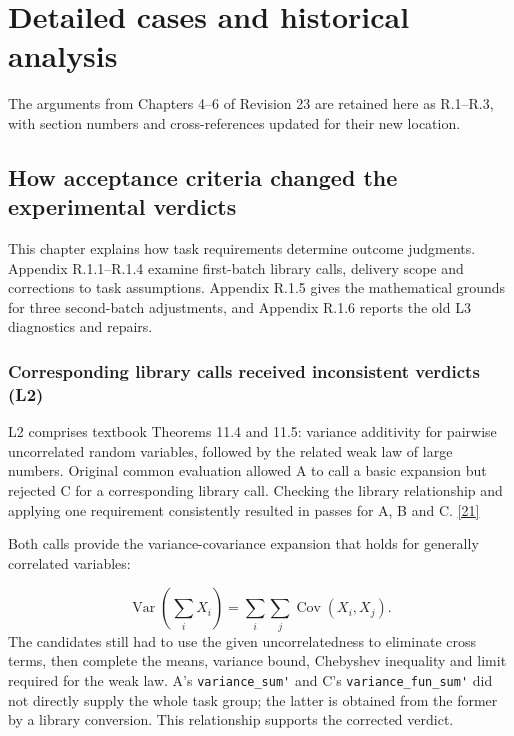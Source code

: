 \section[Detailed cases and historical analysis]{\texorpdfstring{\protect\hypertarget{appendix-r}{}Detailed cases and historical analysis}{Detailed cases and historical analysis}}
The arguments from Chapters 4–6 of Revision 23 are retained here as R.1–R.3, with section numbers and cross-references updated for their new location.

\subsection[How acceptance criteria changed the experimental verdicts]{\texorpdfstring{\protect\hypertarget{r1}{}How acceptance criteria changed the experimental verdicts}{How acceptance criteria changed the experimental verdicts}}
This chapter explains how task requirements determine outcome judgments. Appendix R.1.1–R.1.4 examine first-batch library calls, delivery scope and corrections to task assumptions. Appendix R.1.5 gives the mathematical grounds for three second-batch adjustments, and Appendix R.1.6 reports the old L3 diagnostics and repairs.

\subsubsection[Corresponding library calls received inconsistent verdicts (L2)]{\texorpdfstring{\protect\hypertarget{r1-1}{}Corresponding library calls received inconsistent verdicts (L2)}{Corresponding library calls received inconsistent verdicts (L2)}}
L2 comprises textbook Theorems 11.4 and 11.5: variance additivity for pairwise uncorrelated random variables, followed by the related weak law of large numbers. Original common evaluation allowed A to call a basic expansion but rejected C for a corresponding library call. Checking the library relationship and applying one requirement consistently resulted in passes for A, B and C. \href{en.pdf\#ref-21}{\mbox{[21]}}

Both calls provide the variance-covariance expansion that holds for generally correlated variables:

\[
\operatorname{Var}\!\left(\sum_i X_i\right)
=\sum_i\sum_j\operatorname{Cov}(X_i,X_j).
\]
The candidates still had to use the given uncorrelatedness to eliminate cross terms, then complete the means, variance bound, Chebyshev inequality and limit required for the weak law. A's \nolinkurl{variance_sum'} and C's \nolinkurl{variance_fun_sum'} did not directly supply the whole task group; the latter is obtained from the former by a library conversion. This relationship supports the corrected verdict.


